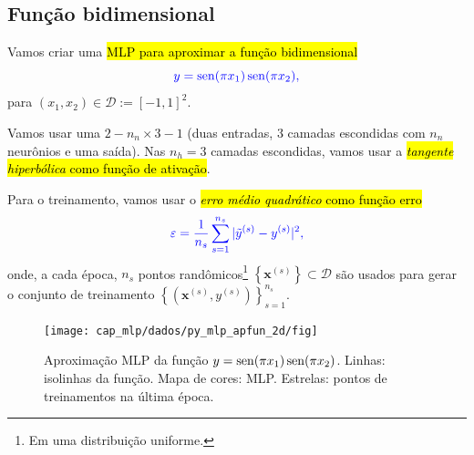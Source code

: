 \subsection{Função bidimensional}\label{mlp_apfun_2d}

Vamos criar uma \hl{MLP para aproximar a função bidimensional}
\begin{equation}\color{blue}y = \operatorname{sen}(\pi x_1)\operatorname{sen}(\pi x_2),
\end{equation}
para $(x_1, x_2) \in \mathcal{D} := [-1, 1]^2$.

Vamos usar uma  $2 - n_n\times 3 - 1$ (duas entradas, 3 camadas escondidas com $n_n$ neurônios e uma saída). Nas $n_h=3$ camadas escondidas, vamos usar a \hl{\emph{tangente hiperbólica} como função de ativação}.

Para o treinamento, vamos usar o \hl{\emph{erro médio quadrático} como função erro}
\begin{equation}\color{blue}\varepsilon = \frac{1}{n_s}\sum_{s=1}^{n_s}|\tilde{y}^{(s)} - y^{(s)}|^2,
\end{equation}
onde, a cada época, $n_s$ pontos randômicos\footnote{Em uma distribuição uniforme.} $\left\{\pmb{x}^{(s)}\right\}\subset \mathcal{D}$ são usados para gerar o conjunto de treinamento $\left\{\left(\pmb{x}^{(s)}, y^{(s)}\right)\right\}_{s=1}^{n_s}$. 

\begin{figure}[H]
  \centering
  \texttt{[image: cap\_mlp/dados/py\_mlp\_apfun\_2d/fig]}
  \caption{Aproximação MLP da função $y = \operatorname{sen}(\pi x_1)\operatorname{sen}(\pi x_2)$. Linhas: isolinhas da função. Mapa de cores: MLP. Estrelas: pontos de treinamentos na última época.}
  \label{fig:mlp_apfun_2d}
\end{figure}

